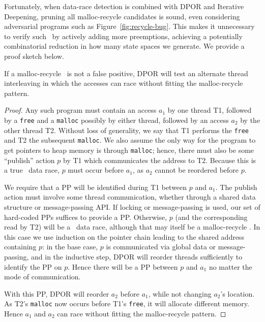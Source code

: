 Fortunately, when data-race detection is combined with DPOR and Iterative Deepening, pruning all malloc-recycle candidates is sound, even considering adversarial programs such as Figure~\ref{fig:recycle-bug}.
This makes it unnecessary to verify such ~by actively adding more preemptions,
achieving a potentially combinatorial reduction in how many state spaces we generate.
We provide a proof sketch below.

\begin{theorem}
	If a malloc-recycle ~is not a false positive,
DPOR will test an alternate thread interleaving in which
the accesses can race without fitting the malloc-recycle pattern.
\end{theorem}

\begin{proof}
Any such program must contain an access $a_1$ by one thread T1,
followed by a {\tt free} and a {\tt malloc} possibly by either thread,
followed by an access $a_2$ by the other thread T2. %
Without loss of generality, we say that T1 performs the {\tt free} and T2 the subsequent {\tt malloc}. %
We also assume the only way for the program to get pointers to heap memory is through {\tt malloc};
hence, there must also be some ``publish'' action $p$ by T1 which communicates the address to T2.
Because this is a true ~data race, $p$ must occur before $a_1$, as $a_2$ cannot be reordered before $p$.

We require that a PP will be identified during T1 between $p$ and $a_1$.
The publish action must involve some thread communication, whether through a shared data structure or message-passing API.
If locking or message-passing is used, our set of hard-coded PPs suffices to provide a PP.
	Otherwise, $p$ (and the corresponding read by T2) will be a ~data race, although that may itself be a malloc-recycle .
In this case we use induction on the pointer chain leading to the shared address containing $p$:
in the base case, $p$ is communicated via global data or message-passing,
and in the inductive step, DPOR will reorder threads sufficiently to identify the PP on $p$.
Hence there will be a PP between $p$ and $a_1$ no matter the mode of communication.

With this PP, DPOR will reorder $a_2$ before $a_1$, while not changing $a_2$'s location.
As T2's {\tt malloc} now occurs before T1's {\tt free}, it will allocate different memory.
Hence $a_1$ and $a_2$ %
can race without fitting the malloc-recycle pattern.
\end{proof}
\renewcommand\proofname{Proof}

